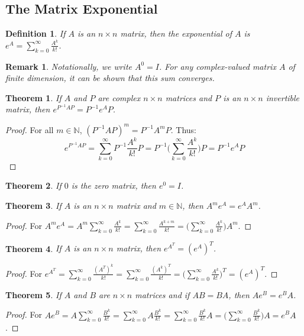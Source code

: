 \documentclass[oneside]{book}
\theoremstyle{mystyle}
\newtheorem{theorem}{Theorem}[section]
\newtheorem{definition}{Definition}[section]
\newtheorem{remark}{Remark}[section]
\begin{document}
\subsection{The Matrix Exponential}
\begin{definition}
If $A$ is an $n\times n$ matrix, then the exponential of $A$ is $e^{A} =\sum_{k=0}^{\infty} \frac{A^k}{k!}$.
\end{definition}
\begin{remark}
Notationally, we write $A^0 = I$. For any complex-valued matrix $A$ of finite dimension, it can be shown that this sum converges.
\end{remark}
\begin{theorem}
If $A$ and $P$ are complex $n\times n$ matrices and $P$ is an $n\times n$ invertible matrix, then $e^{P^{-1}AP} = P^{-1}e^{A}P$.
\end{theorem}
\begin{proof}
For all $m\in \mathbb{N}$, $(P^{-1}AP)^{m} = P^{-1}A^mP$. Thus:
\begin{equation*}
    e^{P^{-1}AP} = \sum_{k=0}^{\infty} P^{-1}\frac{A^k}{k!}P = P^{-1}\big(\sum_{k=0}^{\infty} \frac{A^k}{k!}\big)P = P^{-1}e^A P
\end{equation*}
\end{proof}
\begin{theorem}
If $0$ is the zero matrix, then $e^0 = I$.
\end{theorem}
\begin{theorem}
If $A$ is an $n\times n$ matrix and $m\in \mathbb{N}$, then $A^{m} e^{A} = e^{A} A^{m}$.
\end{theorem}
\begin{proof}
For $A^{m} e^{A} = A^{m} \sum_{k=0}^{\infty} \frac{A^{k}}{k!} = \sum_{k=0}^{\infty} \frac{A^{k+m}}{k!} = \big(\sum_{k=0}^{\infty} \frac{A^k}{k!}\big)A^{m}$.
\end{proof}
\begin{theorem}
If $A$ is an $n\times n$ matrix, then $e^{A^{T}} = (e^{A})^{T}$.
\end{theorem}
\begin{proof}
For $e^{A^{T}} = \sum_{k=0}^{\infty} \frac{(A^{T})^{k}}{k!} = \sum_{k=0}^{\infty} \frac{(A^{k})^{T}}{k!} = \big(\sum_{k=0}^{\infty} \frac{A^{k}}{k!}\big)^{T} = (e^{A})^{T}$.
\end{proof}
\begin{theorem}
If $A$ and $B$ are $n\times n$ matrices and if $AB = BA$, then $Ae^{B} = e^{B} A$.
\end{theorem}
\begin{proof}
For $Ae^{B} = A\sum_{k=0}^{\infty} \frac{B^{k}}{k!} = \sum_{k=0}^{\infty} A\frac{B^{k}}{k!} = \sum_{k=0}^{\infty} \frac{B^{k}}{k!}A = \big(\sum_{k=0}^{\infty} \frac{B^{k}}{k!}\big)A = e^{B}A$.
\end{proof}
\end{document}
